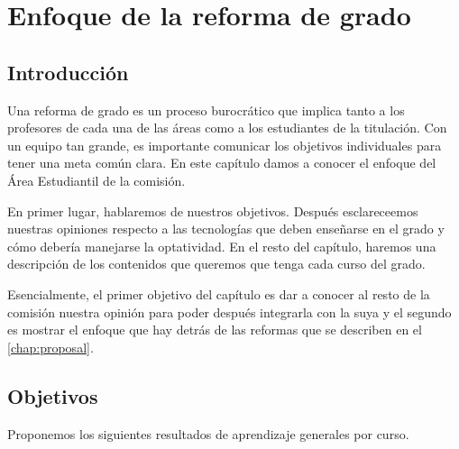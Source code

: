 \chapter{Enfoque de la reforma de grado}\label{chap:approach}

\section{Introducción}


Una reforma de grado es un proceso burocrático que implica tanto a los
profesores de cada una de las áreas como a los estudiantes de la titulación.
Con un equipo tan grande,
es importante comunicar los objetivos individuales para
tener una meta común clara.
En este capítulo damos a conocer el enfoque del Área Estudiantil de la comisión.


En primer lugar, hablaremos de nuestros objetivos.
Después esclareceemos nuestras opiniones respecto a
las tecnologías que deben enseñarse en el grado y
cómo debería manejarse la optatividad.
En el resto del capítulo,
haremos una descripción de
los contenidos que queremos que tenga cada curso del grado.


Esencialmente, el primer objetivo del capítulo es
dar a conocer al resto de la comisión nuestra opinión
para poder después integrarla con la suya y
el segundo es mostrar el enfoque que
hay detrás de las reformas que se describen en el \cref{chap:proposal}.

\section{Objetivos}

Proponemos los siguientes resultados de aprendizaje generales por curso.

